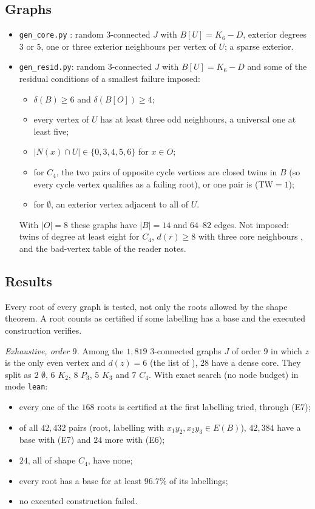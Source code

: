 \documentclass[11pt]{amsart}
\theoremstyle{definition}
\begin{document}
\subsection*{Graphs}
\begin{itemize}
\item \texttt{gen\_core.py} \cite{TM}: random $3$-connected $J$ with $B[U]=K_6-D$, exterior
degrees $3$ or $5$, one or three exterior neighbours per vertex of $U$; a sparse exterior.
\item \texttt{gen\_resid.py}: random $3$-connected $J$ with $B[U]=K_6-D$ and some of the
residual conditions of a smallest failure imposed:
  \begin{itemize}
  \item $\delta(B)\ge6$ and $\delta(B[O])\ge4$;
  \item every vertex of $U$ has at least three odd neighbours, a universal one at least five;
  \item $|N(x)\cap U|\in\{0,3,4,5,6\}$ for $x\in O$;
  \item for $C_4$, the two pairs of opposite cycle vertices are closed twins in $B$ (so every
  cycle vertex qualifies as a failing root), or one pair is (TW$=1$);
  \item for $\emptyset$, an exterior vertex adjacent to all of $U$.
  \end{itemize}
  With $|O|=8$ these graphs have $|B|=14$ and $64$--$82$ edges. Not imposed: twins of degree at
  least eight for $C_4$, $d(r)\ge8$ with three core neighbours \cite[Thm~144]{MR}, and the
  bad-vertex table of the reader notes.
\end{itemize}

\subsection*{Results}
Every root of every graph is tested, not only the roots allowed by the shape theorem. A root
counts as certified if some labelling has a base and the executed construction verifies.

\emph{Exhaustive, order $9$.} Among the $1{,}819$ $3$-connected graphs $J$ of order $9$ in which
$z$ is the only even vertex and $d(z)=6$ (the list of \cite[\S8]{TM}), $28$ have a dense core.
They split as $2$ $\emptyset$, $6$ $K_2$, $8$ $P_3$, $5$ $K_3$ and $7$ $C_4$. With exact search
(no node budget) in mode \texttt{lean}:
\begin{itemize}
\item every one of the $168$ roots is certified at the first labelling tried, through (E7);
\item of all $42{,}432$ pairs (root, labelling with $x_1y_2,x_2y_3\in E(B)$), $42{,}384$ have a
base with (E7) and $24$ more with (E6);
\item $24$, all of shape $C_4$, have none;
\item every root has a base for at least $96.7\%$ of its labellings;
\item no executed construction failed.
\end{itemize}
\end{document}
